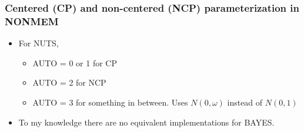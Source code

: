 \documentclass[handout]{beamer}
\begin{document}
\begin{frame}
  \frametitle{Centered (CP) and non-centered (NCP) parameterization in NONMEM}
  
  \begin{itemize}
  \item For NUTS, 
    \begin{itemize}
    \item AUTO = 0 or 1 for CP
      \item AUTO = 2 for NCP
 \item AUTO = 3 for something in between. Uses $N(0, \omega)$ instead
   of $N(0, 1)$
    \end{itemize}
\item To my knowledge there are no equivalent implementations for BAYES.
  \end{itemize}

\end{frame}
\end{document}
